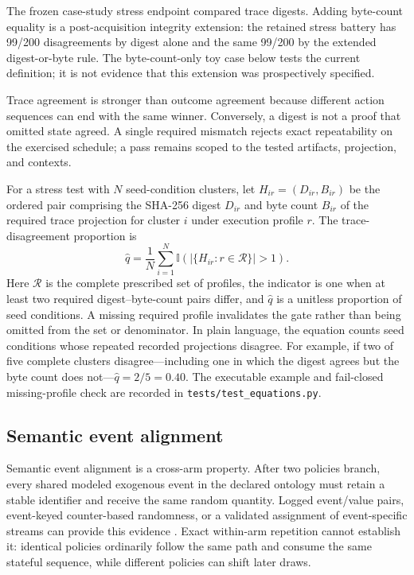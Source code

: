 \documentclass[aps,reprint,superscriptaddress,longbibliography,floatfix]{revtex4-2}
\begin{document}
The frozen case-study stress endpoint compared trace digests.  Adding byte-count
equality is a post-acquisition integrity extension: the retained stress battery
has 99/200 disagreements by digest alone and the same 99/200 by the extended
digest-or-byte rule.  The byte-count-only toy case below tests the current
definition; it is not evidence that this extension was prospectively specified.

Trace agreement is stronger than outcome agreement because different action
sequences can end with the same winner.  Conversely, a digest is not a proof
that omitted state agreed.  A single required mismatch rejects exact
repeatability on the exercised schedule; a pass remains scoped to the tested
artifacts, projection, and contexts.

For a stress test with $N$ seed-condition clusters, let
$H_{ir}=(D_{ir},B_{ir})$ be the ordered pair comprising the SHA-256 digest
$D_{ir}$ and byte count $B_{ir}$ of the required trace projection for cluster
$i$ under execution profile $r$.  The trace-disagreement proportion is
\begin{equation}
 \widehat q = \frac{1}{N}\sum_{i=1}^{N}
 \mathbb{I}\!\left(\left|\{H_{ir}:r\in\mathcal{R}\}\right|>1\right).
 \label{eq:trace-disagreement}
\end{equation}
Here $\mathcal{R}$ is the complete prescribed set of profiles, the indicator is
one when at least two required digest--byte-count pairs differ, and
$\widehat q$ is a unitless proportion of seed conditions.  A missing required
profile invalidates the gate rather than being omitted from the set or
denominator.  In plain language, the equation counts seed conditions whose
repeated recorded projections disagree.  For example, if two of five complete
clusters disagree---including one in which the digest agrees but the byte count
does not---$\widehat q=2/5=0.40$.  The executable example and fail-closed
missing-profile check are recorded in \texttt{tests/test\_equations.py}.

\subsection{Semantic event alignment}

Semantic event alignment is a cross-arm property.  After two policies branch,
every shared modeled exogenous event in the declared ontology must retain a
stable identifier and receive the same random quantity.  Logged event/value
pairs, event-keyed counter-based randomness, or a validated assignment of
event-specific streams can provide this evidence
\cite{lecuyer2002streams,buffalo2026eventkeyed}.  Exact within-arm repetition
cannot establish it: identical policies ordinarily follow the same path and
consume the same stateful sequence, while different policies can shift later
draws.
\end{document}
